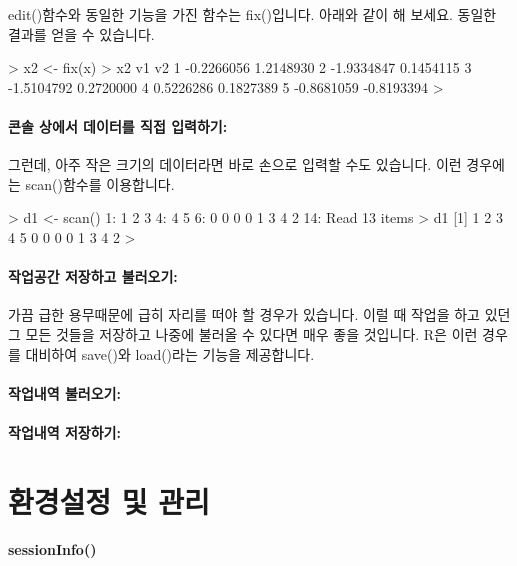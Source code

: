 edit()함수와 동일한 기능을 가진 함수는 fix()입니다. 
아래와 같이 해 보세요. 동일한 결과를 얻을 수 있습니다. 
\begin{Schunk}
\begin{Soutput}
> x2 <- fix(x)
> x2
          v1         v2
1 -0.2266056  1.2148930
2 -1.9334847  0.1454115
3 -1.5104792  0.2720000
4  0.5226286  0.1827389
5 -0.8681059 -0.8193394
> 
\end{Soutput}
\end{Schunk}

\paragraph{콘솔 상에서 데이터를 직접 입력하기:}
그런데, 아주 작은 크기의 데이터라면 바로 손으로 입력할 수도 있습니다.
이런 경우에는 scan()함수를 이용합니다. 

\begin{Schunk}
\begin{Soutput}
> d1 <- scan()
1: 1 2 3 
4: 4 5 
6: 0 0 0 0 1 3 4 2 
14: 
Read 13 items
> d1
 [1] 1 2 3 4 5 0 0 0 0 1 3 4 2
> 
\end{Soutput}
\end{Schunk}

\paragraph{작업공간 저장하고 불러오기:}
가끔 급한 용무때문에 급히 자리를 떠야 할 경우가 있습니다. 
이럴 때 작업을 하고 있던 그 모든 것들을 저장하고 나중에 불러올 수 있다면 매우 좋을 것입니다.
R은 이런 경우를 대비하여 save()와 load()라는 기능을 제공합니다. 

\paragraph{작업내역 불러오기:}

\paragraph{작업내역 저장하기:}



\section{환경설정 및 관리}

\paragraph{sessionInfo()}

